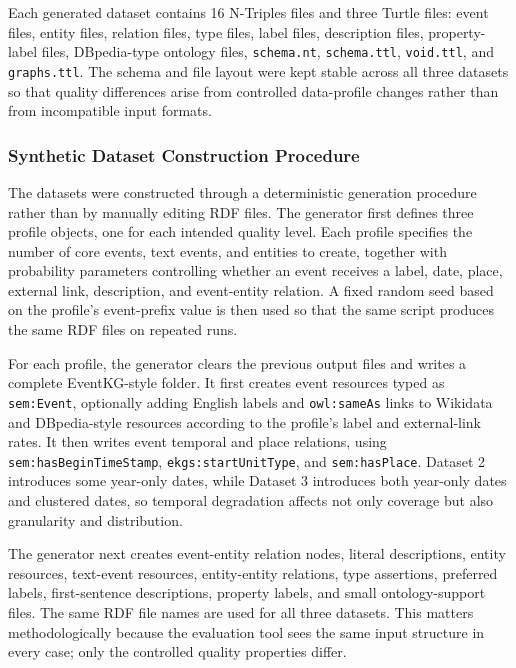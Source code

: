 Each generated dataset contains 16 N-Triples files and three Turtle files: event files, entity files, relation files, type files, label files, description files, property-label files, DBpedia-type ontology files, \texttt{schema.nt}, \texttt{schema.ttl}, \texttt{void.ttl}, and \texttt{graphs.ttl}. The schema and file layout were kept stable across all three datasets so that quality differences arise from controlled data-profile changes rather than from incompatible input formats.

\subsubsection{Synthetic Dataset Construction Procedure}

The datasets were constructed through a deterministic generation procedure rather than by manually editing RDF files. The generator first defines three profile objects, one for each intended quality level. Each profile specifies the number of core events, text events, and entities to create, together with probability parameters controlling whether an event receives a label, date, place, external link, description, and event-entity relation. A fixed random seed based on the profile's event-prefix value is then used so that the same script produces the same RDF files on repeated runs.

For each profile, the generator clears the previous output files and writes a complete EventKG-style folder. It first creates event resources typed as \texttt{sem:Event}, optionally adding English labels and \texttt{owl:sameAs} links to Wikidata and DBpedia-style resources according to the profile's label and external-link rates. It then writes event temporal and place relations, using \texttt{sem:hasBeginTimeStamp}, \texttt{ekgs:startUnitType}, and \texttt{sem:hasPlace}. Dataset 2 introduces some year-only dates, while Dataset 3 introduces both year-only dates and clustered dates, so temporal degradation affects not only coverage but also granularity and distribution.

The generator next creates event-entity relation nodes, literal descriptions, entity resources, text-event resources, entity-entity relations, type assertions, preferred labels, first-sentence descriptions, property labels, and small ontology-support files. The same RDF file names are used for all three datasets. This matters methodologically because the evaluation tool sees the same input structure in every case; only the controlled quality properties differ.

